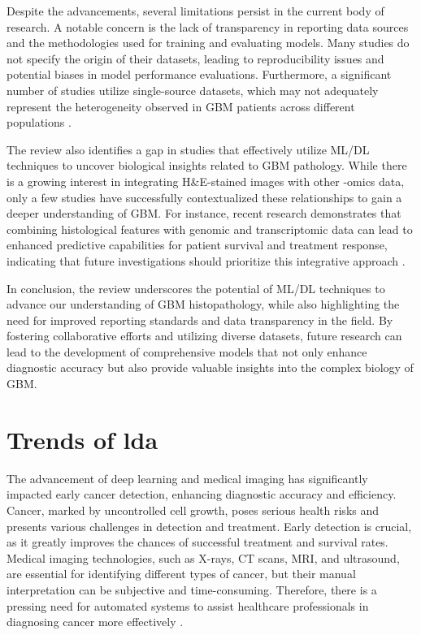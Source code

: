 \documentclass[runningheads]{llncs}
\begin{document}
Despite the advancements, several limitations persist in the current body of research. A notable concern is the lack of transparency in reporting data sources and the methodologies used for training and evaluating models. Many studies do not specify the origin of their datasets, leading to reproducibility issues and potential biases in model performance evaluations. Furthermore, a significant number of studies utilize single-source datasets, which may not adequately represent the heterogeneity observed in GBM patients across different populations \cite{32,34,36}.

The review also identifies a gap in studies that effectively utilize ML/DL techniques to uncover biological insights related to GBM pathology. While there is a growing interest in integrating H\&E-stained images with other -omics data, only a few studies have successfully contextualized these relationships to gain a deeper understanding of GBM. For instance, recent research demonstrates that combining histological features with genomic and transcriptomic data can lead to enhanced predictive capabilities for patient survival and treatment response, indicating that future investigations should prioritize this integrative approach \cite{30,34,48}.

In conclusion, the review underscores the potential of ML/DL techniques to advance our understanding of GBM histopathology, while also highlighting the need for improved reporting standards and data transparency in the field. By fostering collaborative efforts and utilizing diverse datasets, future research can lead to the development of comprehensive models that not only enhance diagnostic accuracy but also provide valuable insights into the complex biology of GBM.
\section{Trends of lda}
The advancement of deep learning and medical imaging has significantly impacted early cancer detection, enhancing diagnostic accuracy and efficiency. Cancer, marked by uncontrolled cell growth, poses serious health risks and presents various challenges in detection and treatment. Early detection is crucial, as it greatly improves the chances of successful treatment and survival rates. Medical imaging technologies, such as X-rays, CT scans, MRI, and ultrasound, are essential for identifying different types of cancer, but their manual interpretation can be subjective and time-consuming. Therefore, there is a pressing need for automated systems to assist healthcare professionals in diagnosing cancer more effectively \cite{Istiak_2024}.
\end{document}
